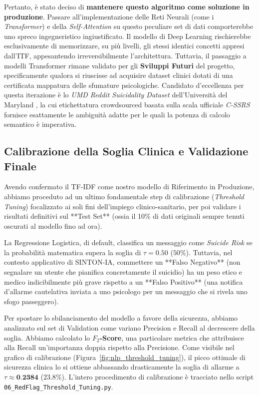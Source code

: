 Pertanto, è stato deciso di \textbf{mantenere questo algoritmo come soluzione in produzione}.
Passare all'implementazione delle Reti Neurali (come i \textit{Transformer}) e della \textit{Self-Attention} su questo peculiare set di dati comporterebbe uno spreco ingegneristico ingiustificato. Il modello di Deep Learning rischierebbe esclusivamente di memorizzare, su più livelli, gli stessi identici concetti appresi dall'ITF, appesantendo irreversibilmente l'architettura.
Tuttavia, il passaggio a modelli Transformer rimane validato per gli \textbf{Sviluppi Futuri} del progetto, specificamente qualora si riuscisse ad acquisire dataset clinici dotati di una certificata mappatura delle sfumature psicologiche. Candidato d'eccellenza per questa iterazione è lo \textit{UMD Reddit Suicidality Dataset} dell'Università del Maryland \cite{umd_reddit_suicidality}, la cui etichettatura crowdsourced basata sulla scala ufficiale \textit{C-SSRS} fornisce esattamente le ambiguità adatte per le quali la potenza di calcolo semantico è imperativa.

\subsection{Calibrazione della Soglia Clinica e Validazione Finale}
Avendo confermato il TF-IDF come nostro modello di Riferimento in Produzione, abbiamo proceduto ad un ultimo fondamentale step di calibrazione (\textit{Threshold Tuning}) focalizzato ai soli fini dell'impiego clinico-sanitario, per poi validare i risultati definitivi sul **Test Set** (ossia il 10\% di dati originali sempre tenuti oscurati al modello fino ad ora).

La Regressione Logistica, di default, classifica un messaggio come \textit{Suicide Risk} se la probabilità matematica supera la soglia di $\tau = 0.50$ ($50\%$). Tuttavia, nel contesto applicativo di SINTON-IA, commettere un **Falso Negativo** (non segnalare un utente che pianifica concretamente il suicidio) ha un peso etico e medico indicibilmente più grave rispetto a un **Falso Positivo** (una notifica d'allarme cautelativa inviata a uno psicologo per un messaggio che si rivela uno sfogo passeggero).

Per spostare lo sbilanciamento del modello a favore della sicurezza, abbiamo analizzato sul set di Validation come variano Precision e Recall al decrescere della soglia. Abbiamo calcolato lo \textbf{$F_{2}$-Score}, una particolare metrica che attribuisce alla Recall un'importanza doppia rispetto alla Precisione.
Come visibile nel grafico di calibrazione (Figura~\ref{fig:nlp_threshold_tuning}), il picco ottimale di sicurezza clinica lo si ottiene abbassando drasticamente la soglia di allarme a $\tau \approx \textbf{0.2384}$ ($23.8\%$). L'intero procedimento di calibrazione è tracciato nello script \texttt{06\_RedFlag\_Threshold\_Tuning.py}.


